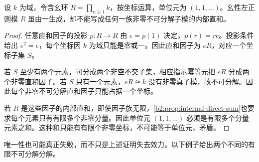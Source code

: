 \begin{example}[没有不可分解直和分解的循环模]\label{b2:ex:no-indecomposable-decomposition}
	设 \(k\) 为域，令含幺环 \(R=\prod_{n\ge1}k\)，按坐标运算，单位元为 \((1,1,\ldots)\)。幺性左正则模 \(R\) 虽由一生成，却不能写成任何一族非零不可分解子模的内部直和。
\end{example}
\begin{proof}
	任意直和因子的投影 \(p:R\rightarrow R\) 由 \(e=p(1)\) 决定，\(p(r)=re\)。投影条件给出 \(e^2=e\)，每个坐标因 \(k\) 为域只能是零或一。因此直和因子为 \(eR\)，对应一个坐标子集 \(S\)。

	若 \(S\) 至少有两个元素，可分成两个非空不交子集，相应指示幂等元把 \(eR\) 分成两个非零直和因子。若 \(S\) 只有一个元素，\(eR\cong k\) 没有非零真子模，故不可分解。因此每个非零不可分解直和因子只能占据一个坐标。

	若 \(R\) 是这些因子的内部直和，即使因子族无限，\cref{b2:prop:internal-direct-sum}也要求每个元素只有有限多个非零分量。因此单位元 \((1,1,\ldots)\) 必须是有限多个分量元素之和。这种和只能有有限个非零坐标，不可能等于单位元，矛盾。
\end{proof}

唯一性也可能真正失败，而不只是上述证明失去效力。以下例子给出两个不同的有限不可分解分解。

